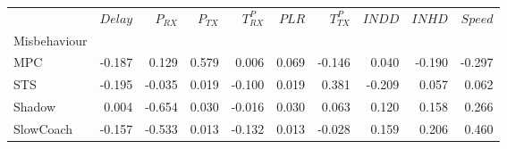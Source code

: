 \begin{tabular}{lrrrrrrrrr}
\toprule
{} &  $Delay$ &  $P_{RX}$ &  $P_{TX}$ &  $T^P_{RX}$ &  $PLR$ &  $T^P_{TX}$ &  $INDD$ &  $INHD$ &  $Speed$ \\
Misbehaviour &          &           &           &             &        &             &         &         &          \\
\midrule
MPC          &   -0.187 &     0.129 &     0.579 &       0.006 &  0.069 &      -0.146 &   0.040 &  -0.190 &   -0.297 \\
STS          &   -0.195 &    -0.035 &     0.019 &      -0.100 &  0.019 &       0.381 &  -0.209 &   0.057 &    0.062 \\
Shadow       &    0.004 &    -0.654 &     0.030 &      -0.016 &  0.030 &       0.063 &   0.120 &   0.158 &    0.266 \\
SlowCoach    &   -0.157 &    -0.533 &     0.013 &      -0.132 &  0.013 &      -0.028 &   0.159 &   0.206 &    0.460 \\
\bottomrule
\end{tabular}
